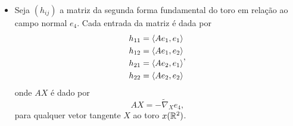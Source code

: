 \documentclass[12pt,a4paper]{beamer}
\theoremstyle{definition}
\begin{document}
\begin{frame}

	\begin{itemize}
		
		\item Seja $(h_{ij})$ a matriz da segunda forma fundamental do toro em relação ao campo normal $e_4$. Cada entrada da matriz é dada por
		\begin{equation*}
		\begin{split}
		h_{11} &= \left\langle A e_1,e_1 \right\rangle\\
		h_{12} &= \left\langle A e_1,e_2 \right\rangle\\
		h_{21} &= \left\langle A e_2,e_1 \right\rangle\\
		h_{22} &= \left\langle A e_2,e_2 \right\rangle
		\end{split},
		\end{equation*}
		onde $AX$ é dado por
		\[ AX = -\tilde{\nabla}_X e_4, \]
		para qualquer vetor tangente $X$ ao toro $x(\mathbb R^2)$.
		
	\end{itemize}

\end{frame}
\end{document}
